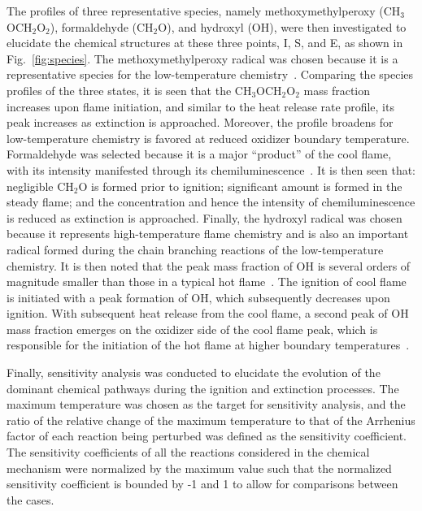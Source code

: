 \documentclass[review,3p,times]{elsarticle}
\begin{document}
The profiles of three representative species, namely methoxymethylperoxy (CH$_3$OCH$_2$O$_2$), formaldehyde (CH$_2$O), and hydroxyl (OH), were then investigated to elucidate the chemical structures at these three points, I, S, and E, as shown in Fig.~\ref{fig:species}.  The methoxymethylperoxy radical was chosen because it is a representative species for the low-temperature chemistry~\cite{deng15,deng15b}.  Comparing the species profiles of the three states, it is seen that the CH$_3$OCH$_2$O$_2$ mass fraction increases upon flame initiation, and similar to the heat release rate profile, its peak increases as extinction is approached.  Moreover, the profile broadens for low-temperature chemistry is favored at reduced oxidizer boundary temperature.  Formaldehyde was selected because it is a major “product” of the cool flame, with its intensity manifested through its chemiluminescence~\cite{zhao16}.  It is then seen that: negligible CH$_2$O is formed prior to ignition; significant amount is formed in the steady flame; and the concentration and hence the intensity of chemiluminescence is reduced as extinction is approached. Finally, the hydroxyl radical was chosen because it represents high-temperature flame chemistry and is also an important radical formed during the chain branching reactions of the low-temperature chemistry.  It is then noted that the peak mass fraction of OH is several orders of magnitude smaller than those in a typical hot flame\textcolor{Rev1}{~\cite{deng15b}}.  The ignition of cool flame is initiated with a peak formation of OH, which subsequently decreases upon ignition.  With subsequent heat release from the cool flame, a second peak of OH mass fraction emerges on the oxidizer side of the cool flame peak, which is responsible for the initiation of the hot flame at higher boundary temperatures~\cite{law12}.

Finally, sensitivity analysis was conducted to elucidate the evolution of the dominant chemical pathways during the ignition and extinction processes.  The maximum temperature was chosen as the target for sensitivity analysis, and the ratio of the relative change of the maximum temperature to that of the Arrhenius factor of each reaction being perturbed was defined as the sensitivity coefficient.  The sensitivity coefficients of all the reactions considered in the chemical mechanism were normalized by the maximum value such that the normalized sensitivity coefficient is bounded by -1 and 1 to allow for comparisons between the cases.
\end{document}
